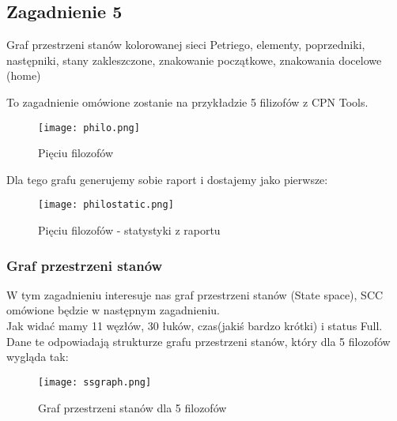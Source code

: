 \documentclass[a4paper,15pt]{article}
\newcommand{\question}[2]{
    \begin{tcolorbox}[colback=black!5!white,colframe=black,title={Zagadnienie #1}]
        #2
    \end{tcolorbox}
}
\begin{document}
\newpage
\subsection{Zagadnienie 5}
\question{5}{
Graf przestrzeni stanów kolorowanej sieci Petriego, elementy,
poprzedniki, następniki, stany zakleszczone, znakowanie początkowe,
znakowania docelowe (home)
}

To zagadnienie omówione zostanie na przykładzie 5 filizofów z CPN Tools.
\begin{figure}[H]
\centerline{\texttt{[image: philo.png]}}
\caption{Pięciu filozofów}
\label{fig:philo}
\end{figure}

Dla tego grafu generujemy sobie raport i dostajemy jako pierwsze:
\begin{figure}[H]
\centerline{\texttt{[image: philostatic.png]}}
\caption{Pięciu filozofów - statystyki z raportu}
\label{fig:philostatic}
\end{figure}

\subsubsection{Graf przestrzeni stanów}
W tym zagadnieniu interesuje nas graf przestrzeni stanów (State space), SCC omówione będzie w następnym zagadnieniu. \\
Jak widać mamy 11 węzłów, 30 łuków, czas(jakiś bardzo krótki) i status Full. Dane te odpowiadają strukturze grafu przestrzeni stanów, który dla 5 filozofów wygląda tak:
\begin{figure}[H]
\centerline{\texttt{[image: ssgraph.png]}}
\caption{Graf przestrzeni stanów dla 5 filozofów}
\label{fig:sccgraph}
\end{figure}
\end{document}
